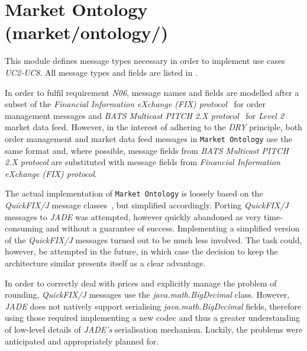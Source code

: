 \section{Market Ontology (market/ontology/)}
\label{Chapters/Implementation/Market-Ontology}
This module defines message types necessary in order to implement use cases  \textit{UC2-UC8}. All message types and fields are listed in .

In order to fulfil requirement \textit{N06}, message names and fields are modelled after a subset of the \textit{Financial Information eXchange (FIX) protocol}~\cite{FIX5} for order management messages and \textit{BATS Multicast PITCH 2.X protocol}~\cite{BATSPITCH} for \textit{Level 2} market data feed. However, in the interest of adhering to the \textit{DRY} principle, both order management and market data feed messages in \texttt{Market Ontology} use the same format and, where possible, message fields from \textit{BATS Multicast PITCH 2.X protocol} are substituted with message fields from \textit{Financial Information eXchange (FIX) protocol}.

The actual implementation of \texttt{Market Ontology} is loosely based on the \textit{QuickFIX/J} message classes~\cite{QUICKFIXJ}, but simplified accordingly. Porting \textit{QuickFIX/J} messages to \textit{JADE} was attempted, however quickly abandoned as very time-consuming and without a guarantee of success. Implementing a simplified version of the \textit{QuickFIX/J} messages turned out to be much less involved. The task could, however, be attempted in the future, in which case the decision to keep the architecture similar presents itself as a clear advantage. 

In order to correctly deal with prices and explicitly manage the problem of rounding, \textit{QuickFIX/J} messages use the \textit{java.math.BigDecimal} class. However, \textit{JADE} does not natively support serialising \textit{java.math.BigDecimal} fields, therefore using those required implementing a new codec and thus a greater understanding of low-level details of \textit{JADE's} serialisation mechanism. Luckily, the problems were anticipated and appropriately planned for.